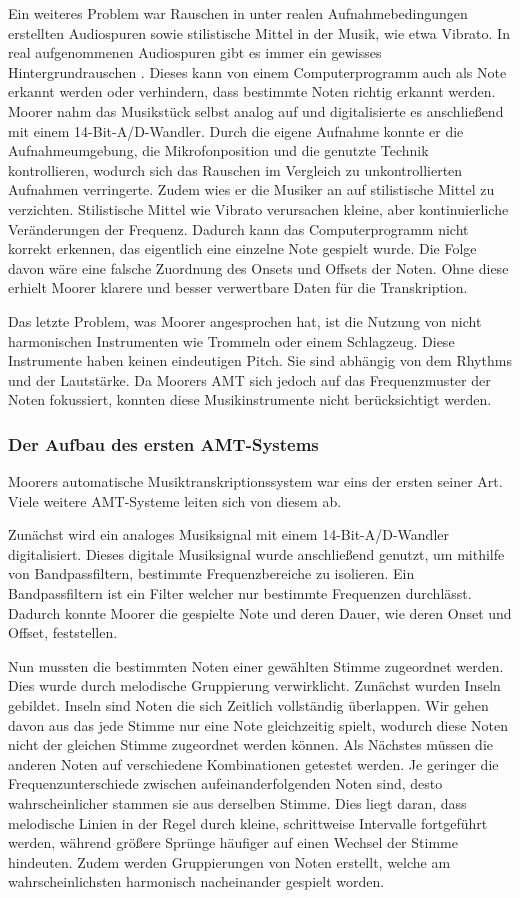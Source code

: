 Ein weiteres Problem war Rauschen in unter realen Aufnahmebedingungen erstellten Audiospuren
sowie stilistische Mittel in der Musik, wie etwa Vibrato.
In real aufgenommenen Audiospuren gibt es immer ein gewisses Hintergrundrauschen \cite{iZotope2025noisefloor}.
Dieses kann von einem Computerprogramm auch als Note erkannt werden oder verhindern,
dass bestimmte Noten richtig erkannt werden.
Moorer nahm das Musikstück selbst analog auf und digitalisierte es anschließend mit einem 14-Bit-A/D-Wandler.
Durch die eigene Aufnahme konnte er die Aufnahmeumgebung, die Mikrofonposition
und die genutzte Technik kontrollieren, wodurch sich das Rauschen im Vergleich zu unkontrollierten Aufnahmen verringerte.
Zudem wies er die Musiker an auf stilistische Mittel zu verzichten.
Stilistische Mittel wie Vibrato verursachen kleine, aber kontinuierliche Veränderungen der Frequenz.
Dadurch kann das Computerprogramm nicht korrekt erkennen, das eigentlich eine einzelne Note gespielt wurde.
Die Folge davon wäre eine falsche Zuordnung des Onsets und Offsets der Noten.
Ohne diese erhielt Moorer klarere und besser verwertbare Daten für die Transkription.

Das letzte Problem, was Moorer angesprochen hat, ist die Nutzung von nicht
harmonischen Instrumenten wie Trommeln oder einem Schlagzeug.
Diese Instrumente haben keinen eindeutigen Pitch.
Sie sind abhängig von dem Rhythms und der Lautstärke.
Da Moorers AMT sich jedoch auf das Frequenzmuster der Noten fokussiert,
konnten diese Musikinstrumente nicht berücksichtigt werden.

\subsubsection{Der Aufbau des ersten AMT-Systems}
Moorers automatische Musiktranskriptionssystem war eins der ersten seiner Art.
Viele weitere AMT-Systeme leiten sich von diesem ab.

Zunächst wird ein analoges Musiksignal mit einem 14-Bit-A/D-Wandler digitalisiert.
Dieses digitale Musiksignal wurde anschließend genutzt, um mithilfe von Bandpassfiltern,
bestimmte Frequenzbereiche zu isolieren.
Ein Bandpassfiltern ist ein Filter welcher nur bestimmte Frequenzen durchlässt.
Dadurch konnte Moorer die gespielte Note und deren Dauer,
wie deren Onset und Offset, feststellen.

Nun mussten die bestimmten Noten einer gewählten Stimme zugeordnet werden.
Dies wurde durch melodische Gruppierung verwirklicht.
Zunächst wurden Inseln gebildet.
Inseln sind Noten die sich Zeitlich vollständig überlappen.
Wir gehen davon aus das jede Stimme nur eine Note gleichzeitig spielt,
wodurch diese Noten nicht der gleichen Stimme zugeordnet werden können.
Als Nächstes müssen die anderen Noten auf verschiedene Kombinationen getestet werden.
Je geringer die Frequenzunterschiede zwischen aufeinanderfolgenden Noten sind,
desto wahrscheinlicher stammen sie aus derselben Stimme.
Dies liegt daran, dass melodische Linien in der Regel durch kleine, schrittweise Intervalle fortgeführt werden,
während größere Sprünge häufiger auf einen Wechsel der Stimme hindeuten.
Zudem werden Gruppierungen von Noten erstellt, welche am wahrscheinlichsten harmonisch nacheinander gespielt worden.

